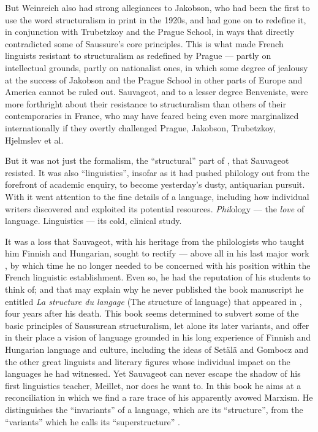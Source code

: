 \documentclass[output=paper]{langscibook}
\begin{document}
But Weinreich also had strong allegiances to Jakobson, who had been the first to use the word structuralism in print in the 1920s, and had gone on to redefine it, in conjunction with Trubetzkoy and the Prague School, in ways that directly contradicted some of Saussure's core principles. This is what made French linguists resistant to structuralism as redefined by Prague — partly on intellectual grounds, partly on nationalist ones, in which some degree of jealousy at the success of Jakobson and the Prague School in other parts of Europe and America cannot be ruled out. Sauvageot, and to a lesser degree Benveniste, were more forthright about their resistance to structuralism than others of their contemporaries in France, who may have feared being even more marginalized internationally if they overtly challenged Prague, Jakobson, Trubetzkoy, Hjelmslev et al.

But it was not just the formalism, the ``structural'' part of , that Sauvageot resisted. It was also ``linguistics'', insofar as it had pushed philology out from the forefront of academic enquiry, to become yesterday's dusty, antiquarian pursuit. With it went attention to the fine details of a language, including how individual writers discovered and exploited its potential resources. \emph{Phil}ology — the \emph{love} of language. Linguistics — its cold, clinical study.

It was a loss that Sauvageot, with his heritage from the philologists who taught him Finnish and Hungarian, sought to rectify — above all in his last major work \citep{Sauvageot1973}, by which time he no longer needed to be concerned with his position within the French linguistic establishment. Even so, he had the reputation of his students to think of; and that may explain why he never published the book manuscript he entitled \emph{La structure du langage} (The structure of language) that appeared in \citeyear{Sauvageot1992}, four years after his death. This book seems determined to subvert some of the basic principles of Saussurean structuralism, let alone its later variants, and offer in their place a vision of language grounded in his long experience of Finnish and Hungarian language and culture, including the ideas of Setälä and Gombocz and the other great linguists and literary figures whose individual impact on the languages he had witnessed. Yet Sauvageot can never escape the shadow of his first linguistics teacher, Meillet, nor does he want to. In this book he aims at a reconciliation in which we find a rare trace of his apparently avowed Marxism. He distinguishes the ``invariants'' of a language, which are its ``structure'', from the ``variants'' which he calls its ``superstructure'' \citep[18]{Sauvageot1992}.
\end{document}
